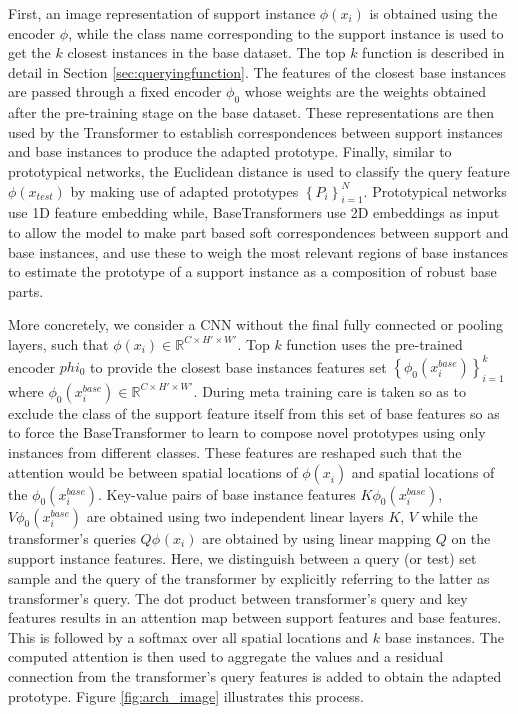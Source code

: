 \documentclass{bmvc2k}
\begin{document}
First, an image representation of support instance \(\phi\left ( x_{i} \right )\) is obtained using the encoder \(\phi\), while the class name corresponding to the support instance is used to get the $k$ closest instances in the base dataset. The top $k$ function is described in detail in Section \ref{sec:queryingfunction}. The features of the closest base instances are passed through a fixed encoder \(\phi_{0}\) whose weights are the weights obtained after the pre-training stage on the base dataset. These representations are then used by the Transformer to establish correspondences between support instances and base instances to produce the adapted prototype. Finally, similar to prototypical networks, the Euclidean distance is used to classify the query feature \(\phi\left ( x_\mathit{test} \right )\) by making use of  adapted prototypes \(\left \{ P_{i}^\mathit{} \right \}_{i=1}^{N}\). Prototypical networks use 1D feature embedding while, BaseTransformers use 2D embeddings as input to allow the model to make part based soft correspondences between support and base instances, and use these to weigh the most relevant regions of base instances to estimate the prototype of a support instance as a composition of robust base parts.

More concretely, we consider a CNN without the final fully connected or pooling layers, such that \(\phi\left ( x_{i} \right )\in \mathbb{R}^{C\times H'\times W'}\). Top $k$ function uses the pre-trained encoder \(phi_{0}\) to provide the closest base instances features set \(\left \{ \phi_{0}\left ( x_{i}^\mathit{base} \right ) \right \}_{i=1}^{k}\) where \(\phi_{0}\left ( x_{i}^\mathit{base} \right )\in \mathbb{R}^{C\times H'\times W'}\). During meta training care is taken so as to exclude the class of the support feature itself from this set of base features so as to force the BaseTransformer to learn to compose novel prototypes using only instances from different classes. These features are reshaped such that the attention would be between spatial locations of \( \phi\left ( x_{i}^{} \right ) \) and spatial locations of the \( \phi_{0}\left ( x_{i}^\mathit{base} \right )\). Key-value pairs of base instance features \(K\phi_{0}\left ( x_{i}^\mathit{base} \right ) \), \(V \phi_{0}\left ( x_{i}^\mathit{base} \right ) \) are obtained using two independent linear layers $K$, $V$ while the transformer's queries \(Q \phi_{}\left ( x_{i} \right ) \) are obtained by using linear mapping $Q$ on the support instance features. Here, we distinguish between a query (or test) set sample and the query of the transformer by explicitly referring to the latter as transformer's query. The dot product between transformer's query and key features results in an attention map between support features and base features. This is followed by a softmax over all spatial locations and $k$ base instances. The computed attention is then used to aggregate the values and a residual connection from the transformer's query features is added to obtain the adapted prototype. Figure \ref{fig:arch_image} illustrates this process.  
\end{document}
